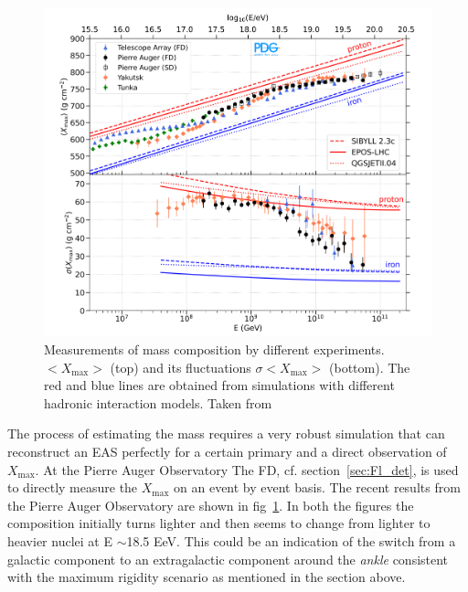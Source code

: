 \begin{figure}[t!]
  \centering
  \includegraphics[width=14.5cm]{thesis_figures/CRnNu/Composition_measurement.png}
  \caption{Measurements of mass composition by different experiments. $<X_{\text{max}}>$ (top) and its fluctuations $\sigma<X_{\text{max}}>$ (bottom). The red and blue lines are obtained from simulations with different hadronic interaction models. Taken from ~\cite{ParticleDataGroup:2024cfk}}
  \label{fig:CR-composition}
\end{figure}

The process of estimating the mass requires a very robust simulation that can reconstruct an EAS perfectly for a certain primary and a direct observation of $X_{\text{max}}$. At the Pierre Auger Observatory The \gls{FD}, cf. section~\ref{sec:Fl_det}, is used to directly measure the $X_{\text{max}}$ on an event by event basis. The recent results from the Pierre Auger Observatory are shown in fig~\ref{fig:CR-composition}. In both the figures the composition initially turns lighter and then seems to change from lighter to heavier nuclei at E $\sim$18.5 EeV. This could be an indication of the switch from a galactic component to an extragalactic component around the \textit{ankle} consistent with the maximum rigidity scenario as mentioned in the section above.

